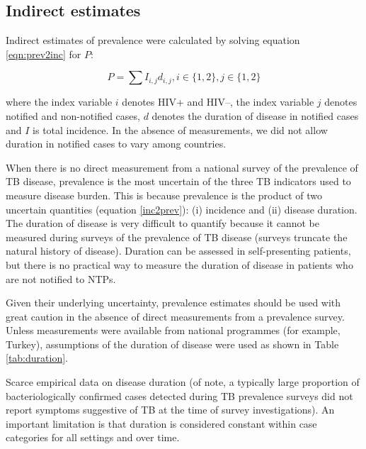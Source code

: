 \subsection{Indirect estimates}
Indirect estimates of prevalence were calculated by solving equation \ref{eqn:prev2inc} for $P$:

\begin{equation}
P = \sum I_{i,j} d_{i,j}, i \in \lbrace 1, 2\rbrace, j \in \lbrace 1, 2\rbrace
\label{eqn:inc2prev}
\end{equation}

where the index variable $i$ denotes HIV+ and HIV–, the index variable $j$ denotes notified and non-notified cases, $d$ denotes the duration of disease in notified cases and $I$ is total incidence. In the absence of measurements, we did not allow duration in notified cases to vary among countries. 

When there is no direct measurement from a national survey of the prevalence of TB disease, prevalence is the most uncertain of the three TB indicators used to measure disease burden. This is because prevalence is the product of two uncertain quantities (equation \ref{inc2prev}): (i) incidence and (ii) disease duration. The duration of disease is very difficult to quantify because it cannot be measured during surveys of the prevalence of TB disease (surveys truncate the natural history of disease). Duration can be assessed in self-presenting patients, but there is no practical way to measure the duration of disease in patients who are not notified to NTPs.

Given their underlying uncertainty, prevalence estimates should be used with great caution in the absence of direct measurements from a prevalence survey. Unless measurements were available from national programmes (for example, Turkey), assumptions of the duration of disease were used as shown in Table \ref{tab:duration}.

Scarce empirical data on disease duration (of note, a typically large proportion of bacteriologically confirmed cases detected during TB prevalence surveys did not report symptoms suggestive of TB at the time of survey investigations). An important limitation is that duration is considered constant within case categories for all settings and over time.